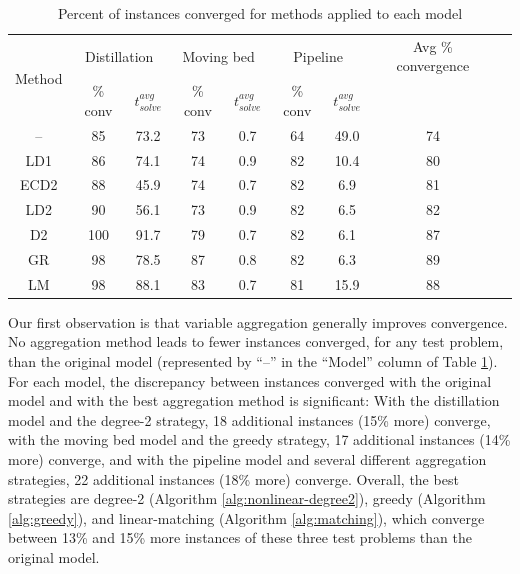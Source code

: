 \documentclass[smallextended]{svjour3}
\begin{document}
\begin{table}
  \centering
  \caption{Percent of instances converged for methods applied to each model}
  \begin{tabular}{ccccccccc}
    \toprule
    \multirow{2}{*}{Method} & \multicolumn{2}{c}{Distillation} & \multicolumn{2}{c}{Moving bed} & \multicolumn{2}{c}{Pipeline} & Avg \% convergence \\ 
     & \% conv & $t_{solve}^{avg}$
     & \% conv & $t_{solve}^{avg}$
     & \% conv & $t_{solve}^{avg}$ \\ 
\midrule
--        &  85 & 73.2 &  73 & 0.7 & 64 & 49.0 & 74\\
LD1       &  86 & 74.1 &  74 & 0.9 &  82 & 10.4 &  80\\
ECD2      &  88 & 45.9 &  74 & 0.7 &  82 & 6.9 & 81\\
LD2       &  90 & 56.1 &  73 & 0.9 &  82 & 6.5 & 82\\
D2        & 100 & 91.7 &  79 & 0.7 &  82 & 6.1 &  87\\
GR        &  98 & 78.5 & 87 & 0.8 & 82 & 6.3 &  89\\
LM        &  98 & 88.1 & 83 & 0.7 & 81 & 15.9 & 88\\
\bottomrule
  \end{tabular}
  \label{tab:convergence}
\end{table}

Our first observation is that variable aggregation generally improves convergence.
No aggregation method leads to fewer instances converged, for any test problem, than
the original model (represented by ``--'' in the ``Model'' column of Table
\ref{tab:convergence}). For each model, the discrepancy between instances converged
with the original model and with the best aggregation method is significant:
With the distillation model and the degree-2 strategy, 18 additional instances (15\% more) converge,
with the moving bed model and the greedy strategy, 17 additional instances (14\% more) converge,
and with the pipeline model and several different aggregation strategies, 22 additional instances
(18\% more) converge.
Overall, the best strategies are degree-2 (Algorithm \ref{alg:nonlinear-degree2}),
greedy (Algorithm \ref{alg:greedy}), and linear-matching (Algorithm \ref{alg:matching}),
which converge between 13\% and 15\% more instances of these three test problems than
the original model.
\end{document}
